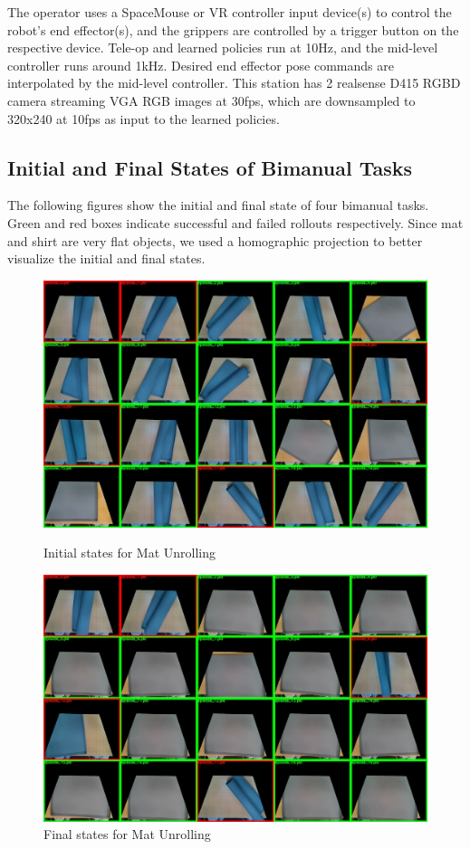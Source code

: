\documentclass[Afour,sageh,times]{sagej}
\begin{document}
The operator uses a SpaceMouse or VR controller input device(s) to control the robot's end effector(s), and the grippers are controlled by a trigger button on the respective device. Tele-op and learned policies run at 10Hz, and the mid-level controller runs around 1kHz. Desired end effector pose commands are interpolated by the mid-level controller. This station has 2 realsense D415 RGBD camera streaming VGA RGB images at 30fps, which are downsampled to 320x240 at 10fps as input to the learned policies.

\subsection{Initial and Final States of Bimanual Tasks} 
\label{sec:bimanual_ini_fial}
The following figures show the initial and final state of four bimanual tasks. Green and red boxes indicate successful and failed rollouts respectively. Since mat and shirt are very flat objects, we used a homographic projection to better visualize the initial and final states.

\begin{figure}
    \centering
    \includegraphics[width=\linewidth]{figure/ijrr24_unroll_mat_ini.jpg}
    \caption{Initial states for Mat Unrolling}
    \label{fig:unroll_mat_ini}
    \centering
    \includegraphics[width=\linewidth]{figure/ijrr24_unroll_mat_last.jpg}
    \caption{Final states for Mat Unrolling}
    \label{fig:unroll_mat_last}
\end{figure}
\end{document}
